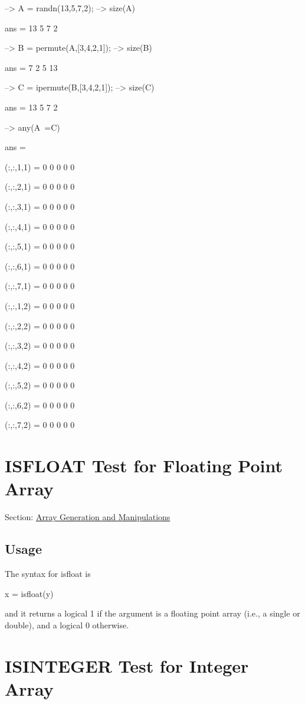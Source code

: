 \begin{DoxyVerbInclude}
--> A = randn(13,5,7,2);
--> size(A)

ans = 
 13  5  7  2 

--> B = permute(A,[3,4,2,1]);
--> size(B)

ans = 
  7  2  5 13 

--> C = ipermute(B,[3,4,2,1]);
--> size(C)

ans = 
 13  5  7  2 

--> any(A~=C)

ans = 

(:,:,1,1) = 
 0 0 0 0 0 

(:,:,2,1) = 
 0 0 0 0 0 

(:,:,3,1) = 
 0 0 0 0 0 

(:,:,4,1) = 
 0 0 0 0 0 

(:,:,5,1) = 
 0 0 0 0 0 

(:,:,6,1) = 
 0 0 0 0 0 

(:,:,7,1) = 
 0 0 0 0 0 

(:,:,1,2) = 
 0 0 0 0 0 

(:,:,2,2) = 
 0 0 0 0 0 

(:,:,3,2) = 
 0 0 0 0 0 

(:,:,4,2) = 
 0 0 0 0 0 

(:,:,5,2) = 
 0 0 0 0 0 

(:,:,6,2) = 
 0 0 0 0 0 

(:,:,7,2) = 
 0 0 0 0 0 
\end{DoxyVerbInclude}
 \hypertarget{array_isfloat}{}\section{I\-S\-F\-L\-O\-A\-T Test for Floating Point Array}\label{array_isfloat}
Section\-: \hyperlink{sec_array}{Array Generation and Manipulations} \hypertarget{vtkwidgets_vtkxyplotwidget_Usage}{}\subsection{Usage}\label{vtkwidgets_vtkxyplotwidget_Usage}
The syntax for {\ttfamily isfloat} is \begin{DoxyVerb}   x = isfloat(y)
\end{DoxyVerb}
 and it returns a logical 1 if the argument is a floating point array (i.\-e., a {\ttfamily single} or {\ttfamily double}), and a logical 0 otherwise. \hypertarget{array_isinteger}{}\section{I\-S\-I\-N\-T\-E\-G\-E\-R Test for Integer Array}\label{array_isinteger}
